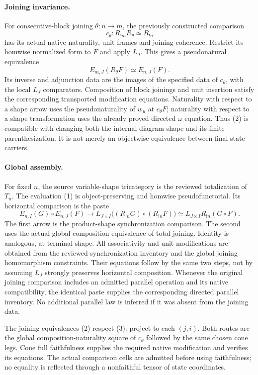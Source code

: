 \documentclass{article}
\begin{document}
\paragraph{Joining invariance.} For consecutive-block joining $\theta:n\to m$, the previously constructed comparison
\[
 c_\theta:R_{!m}R_\theta\simeq R_{!n}
\]
has its actual native naturality, unit frames and joining coherence. Restrict its homwise normalized form to $F$ and apply $L_J$. This gives a pseudonatural equivalence
\[
 E_{m,J}(R_\theta F)\simeq E_{n,J}(F).
\tag{2}
\]
Its inverse and adjunction data are the images of the specified data of $c_\theta$, with the local $L_J$ comparators. Composition of block joinings and unit insertion satisfy the corresponding transported modification equations. Naturality with respect to a shape arrow uses the pseudonaturality of $w_u$ at $c_\theta F$; naturality with respect to a shape transformation uses the already proved directed $\omega$ equation. Thus (2) is compatible with changing both the internal diagram shape and its finite parenthesization. It is not merely an objectwise equivalence between final state carriers.

\paragraph{Global assembly.} For fixed $n$, the source variable-shape tricategory is the reviewed totalization of $T_n$. The evaluation (1) is object-preserving and homwise pseudofunctorial. Its horizontal comparison is the paste
\[
 E_{n,I}(G)\circ E_{n,J}(F)
 \longrightarrow L_{J\times I}\bigl((R_{!n}G)\circ(R_{!n}F)\bigr)
 \simeq L_{J\times I}R_{!n}(G\circ F).
\tag{3}
\]
The first arrow is the product-shape synchronization comparison. The second uses the actual global composition equivalence of total joining. Identity is analogous, at terminal shape. All associativity and unit modifications are obtained from the reviewed synchronization inventory and the global joining homomorphism constraints. Their equations follow by the same two steps, not by assuming $L_J$ strongly preserves horizontal composition. Whenever the original joining comparison includes an admitted parallel operation and its native compatibility, the identical paste supplies the corresponding directed parallel inventory. No additional parallel law is inferred if it was absent from the joining data.

The joining equivalences (2) respect (3): project to each $(j,i)$. Both routes are the global composition-naturality square of $c_\theta$ followed by the same chosen cone legs. Cone full faithfulness supplies the required native modification and verifies its equations. The actual comparison cells are admitted before using faithfulness; no equality is reflected through a nonfaithful tensor of state coordinates.
\end{document}
